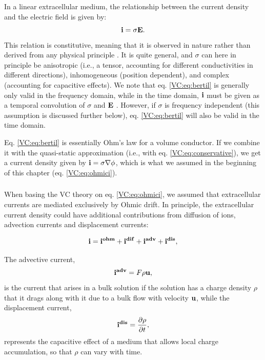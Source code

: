 \subsubsection{ }
\label{sec:VC:LinEx}

In a linear extracellular medium, the relationship between the current density and the electric field is given by:
\begin{equation}
{\bf i} = \sigma {\bf E}.
\label{VC:eq:bertil}
\end{equation}
This relation is constitutive, meaning that it is observed in nature rather than derived from any physical principle \citep{Nunez2006, Pettersen2012}. It is quite general, and $\sigma$ can here in principle be anisotropic (i.e., a tensor, accounting for different conductivities in different directions), inhomogeneous (position dependent), and complex (accounting for capacitive effects). We note that eq. \ref{VC:eq:bertil} is generally only valid in the frequency domain, while in the time domain, ${\bf i}$ must be given as a temporal convolution of $\sigma$ and ${\bf E}$ \citep{Bedard2009}. However, if $\sigma$ is frequency independent (this assumption is discussed further below), eq. \ref{VC:eq:bertil} will also be valid in the time domain.

Eq. \ref{VC:eq:bertil} is essentially Ohm's law for a volume conductor. If we combine it with the quasi-static approximation (i.e., with eq. \ref{VC:eq:conservative}), we get a current density given by ${\bf i} = \sigma \nabla \phi$, which is what we assumed in the beginning of this chapter (eq. \ref{VC:eq:ohmici}).


\subsubsection{}
\label{sec:VC:onlyohmic}
When basing the VC theory on eq. \ref{VC:eq:ohmici}, we assumed that extracellular currents are mediated exclusively by Ohmic drift. In principle, the extracellular current density could have additional contributions from diffusion of ions, advection currents and displacement currents:

\begin{equation}
{\bf i} = {\bf i^{ohm}} + {\bf i^{dif}} + {\bf i^{adv}} + {\bf i^{dis}}, 
\label{VC:eq:generalcurrent}
\end{equation}

The advective current, 
\begin{equation}
{\bf i^{adv}} = F \rho {\bf u}, 
\label{VC:eq:iadv}
\end{equation}
is the current that arises in a bulk solution if the solution has a charge density $\rho$ that it drags along with it due to a bulk flow with velocity ${\bf u}$, while the displacement current,
\begin{equation}
{\bf i^{dis}} = \frac{\partial \rho}{\partial t},
\label{VC:eq:idis}
\end{equation}
represents the capacitive effect of a medium that allows local charge accumulation, so that $\rho$ can vary with time.  

